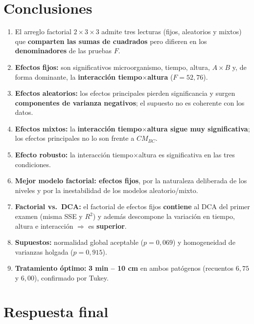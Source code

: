 \documentclass[12pt,a4paper]{article}
\begin{document}
\section{Conclusiones}

\begin{enumerate}
    \item El arreglo factorial $2\times3\times3$ admite tres lecturas (fijos, aleatorios y mixtos) que \textbf{comparten las sumas de cuadrados} pero difieren en los \textbf{denominadores} de las pruebas $F$.
    \item \textbf{Efectos fijos:} son significativos microorganismo, tiempo, altura, $A\times B$ y, de forma dominante, la \textbf{interacción tiempo$\times$altura} ($F=52{,}76$).
    \item \textbf{Efectos aleatorios:} los efectos principales pierden significancia y surgen \textbf{componentes de varianza negativos}; el supuesto no es coherente con los datos.
    \item \textbf{Efectos mixtos:} la \textbf{interacción tiempo$\times$altura sigue muy significativa}; los efectos principales no lo son frente a $CM_{BC}$.
    \item \textbf{Efecto robusto:} la interacción tiempo$\times$altura es significativa en las tres condiciones.
    \item \textbf{Mejor modelo factorial: efectos fijos}, por la naturaleza deliberada de los niveles y por la inestabilidad de los modelos aleatorio/mixto.
    \item \textbf{Factorial vs.\ DCA:} el factorial de efectos fijos \textbf{contiene} al DCA del primer examen (misma SSE y $R^2$) y además descompone la variación en tiempo, altura e interacción $\Rightarrow$ es \textbf{superior}.
    \item \textbf{Supuestos:} normalidad global aceptable ($p=0{,}069$) y homogeneidad de varianzas holgada ($p=0{,}915$).
    \item \textbf{Tratamiento óptimo:} \textbf{3 min -- 10 cm} en ambos patógenos (recuentos $6{,}75$ y $6{,}00$), confirmado por Tukey.
\end{enumerate}

\section{Respuesta final}
\end{document}
